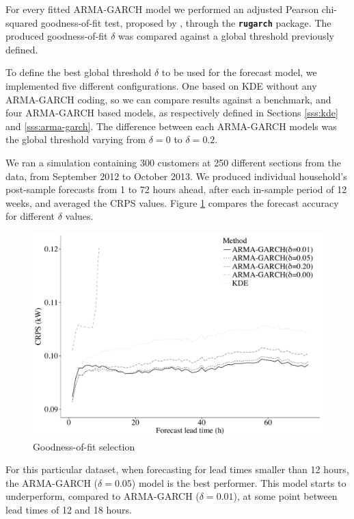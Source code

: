 \documentclass[preprint,3p,12pt,authoryear]{elsarticle}
\begin{document}
For every fitted ARMA-GARCH model we performed an adjusted Pearson chi-squared goodness-of-fit test, proposed by \citet{vlaarpalm_gof}, through the \texttt{\textbf{rugarch}} package.
The produced goodness-of-fit $\delta$ was compared against a global threshold previously defined.

To define the best global threshold $\delta$ to be used for the forecast model, we implemented five different configurations.
One based on KDE without any ARMA-GARCH coding, so we can compare results against a benchmark, and four ARMA-GARCH based models, as respectively defined in Sections \ref{sss:kde} and \ref{sss:arma-garch}.
The difference between each ARMA-GARCH models was the global threshold varying from $\delta = 0$ to $\delta = 0.2$.

We ran a simulation containing 300 customers at 250 different sections from the data, from September 2012 to October 2013.
We produced individual household's post-sample forecasts from 1 to 72 hours ahead, after each in-sample period of 12 weeks, and averaged the CRPS values.
Figure \ref{fig:benchmark} compares the forecast accuracy for different $\delta$ values.

\begin{figure}
  \centering
  \includegraphics[width=0.8\columnwidth]{2017-10-13_big-gofmin_266_graylinesman.pdf}
  \caption{Goodness-of-fit selection}
  \label{fig:benchmark}
\end{figure}

For this particular dataset, when forecasting for lead times smaller than 12 hours, the ARMA-GARCH ($\delta = 0.05$) model is the best performer.
This model starts to underperform, compared to ARMA-GARCH ($\delta = 0.01$), at some point between lead times of 12 and 18 hours.


\end{document}
